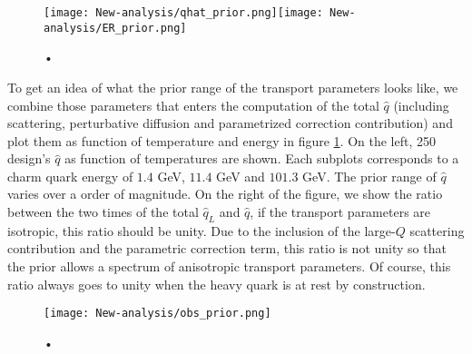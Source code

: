 \begin{figure}
\centering
\texttt{[image: New-analysis/qhat\_prior.png]}\texttt{[image: New-analysis/ER\_prior.png]}
\caption{•}
\label{fig:new:design-qhat}
\end{figure}

To get an idea of what the prior range of the transport parameters looks like, we combine those parameters that enters the computation of the total $\hat{q}$ (including scattering, perturbative diffusion and parametrized correction contribution) and plot them as function of temperature and energy in figure \ref{fig:new:design-qhat}. 
On the left, 250 design's $\hat{q}$ as function of temperatures are shown. Each subplots corresponds to a charm quark energy of $1.4$ GeV, $11.4$ GeV and $101.3$ GeV.
The prior range of $\hat{q}$ varies over a order of magnitude.
On the right of the figure, we show the ratio between the two times of the total $\hat{q}_L$ and $\hat{q}$, if the transport parameters are isotropic, this ratio should be unity.
Due to the inclusion of the large-$Q$ scattering contribution and the parametric correction term, this ratio is not unity so that the prior allows a spectrum of anisotropic transport parameters.
Of course, this ratio always goes to unity when the heavy quark is at rest by construction.

\begin{figure}
\centering
\texttt{[image: New-analysis/obs\_prior.png]}
\caption{•}
\label{fig:new:obs_prior}
\end{figure}

